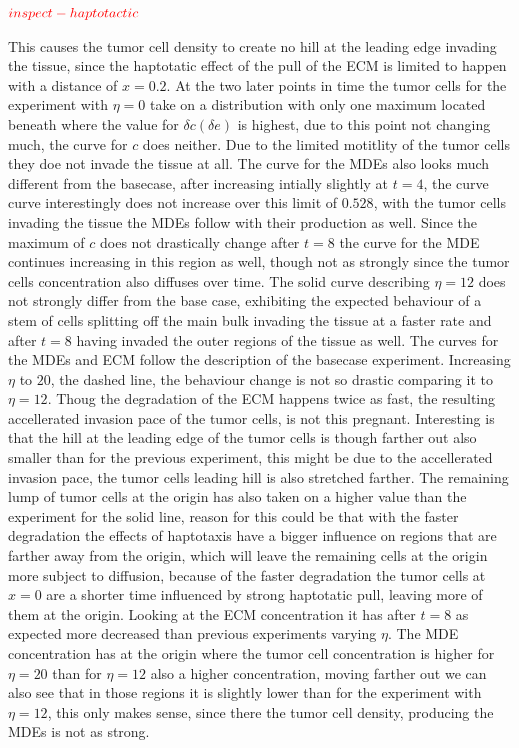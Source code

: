 $\textcolor{red}{inspect-haptotactic}$

This causes the tumor cell density to create no hill at the leading edge invading the tissue, since the haptotatic effect of the pull of the ECM is limited to happen with a distance of $x=0.2$. At the two later points in time the tumor cells for the experiment with $\eta=0$ take on a distribution with only one maximum located beneath where the value for $\delta c (\delta e)$ is highest, due to this point not changing much, the curve for $c$ does neither. Due to the limited motitlity of the tumor cells they doe not invade the tissue at all. The curve for the MDEs also looks much different from the basecase, after increasing intially slightly at $t=4$, the curve curve interestingly does not increase over this limit of $0.528$, with the tumor cells invading the tissue the MDEs follow with their production as well. Since the maximum of $c$ does not drastically change after $t=8$ the curve for the MDE continues increasing in this region as well, though not as strongly since the tumor cells concentration also diffuses over time. 
The solid curve describing $\eta=12$ does not strongly differ from the base case, exhibiting the expected behaviour of a stem of cells splitting off the main bulk invading the tissue at a faster rate and after $t=8$ having invaded the outer regions of the tissue as well. The curves for the MDEs and ECM follow the description of the basecase experiment. 
Increasing $\eta$ to $20$, the dashed line, the behaviour change is not so drastic comparing it to $\eta=12$. Thoug the degradation of the ECM happens twice as fast, the resulting accellerated invasion pace of the tumor cells, is not this pregnant. Interesting is that the hill at the leading edge of the tumor cells is though farther out also smaller than for the previous experiment, this might be due to the accellerated invasion pace, the tumor cells leading hill is also stretched farther. The remaining lump of tumor cells at the origin has also taken on a higher value than the experiment for the solid line, reason for this could be that with the faster degradation the effects of haptotaxis have a bigger influence on regions that are farther away from the origin, which will leave the remaining cells at the origin more subject to diffusion, because of the faster degradation the tumor cells at $x=0$ are a shorter time influenced by strong haptotatic pull, leaving more of them at the origin. Looking at the ECM concentration it has after $t=8$ as expected more decreased than previous experiments varying $\eta$. The MDE concentration has at the origin where the tumor cell concentration is higher for $\eta=20$ than for $\eta=12$ also a higher concentration, moving farther out we can also see that in those regions it is slightly lower than for the experiment with $\eta=12$, this only makes sense, since there the tumor cell density, producing the MDEs is not as strong. 
